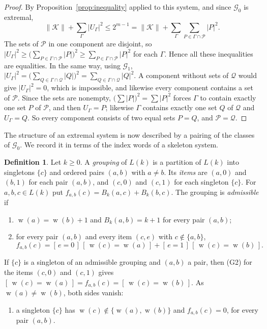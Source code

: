 \documentclass[11pt]{amsart}
\theoremstyle{definition}
\newtheorem{definition}[theorem]{Definition}
\theoremstyle{remark}
\numberwithin{equation}{section}
\newcommand{\cG}{\mathcal{G}}
\newcommand{\cK}{\mathcal{K}}
\newcommand{\cP}{\mathcal{P}}
\newcommand{\cQ}{\mathcal{Q}}
\newcommand{\Iv}[1]{[\,#1\,]}
\DeclareMathOperator{\wt}{w}
\begin{document}
\begin{proof}
By Proposition~\ref{prop:inequality} applied to this system, and since $\cG_0$ is extremal,
\[
\|\cK\|+\sum_\Gamma|U_\Gamma|^2\le 2^{m-1}=\|\cK\|+\sum_\Gamma\sum_{P\in\Gamma\cap\cP}|P|^2 .
\]
The sets of $\cP$ in one component are disjoint, so $|U_\Gamma|^2\ge\bigl(\sum_{P\in\Gamma\cap\cP}|P|\bigr)^2\ge\sum_{P\in\Gamma\cap\cP}|P|^2$ for each $\Gamma$. Hence all these inequalities are equalities. In the same way, using $\cG_1$, $|U_\Gamma|^2=\bigl(\sum_{Q\in\Gamma\cap\cQ}|Q|\bigr)^2=\sum_{Q\in\Gamma\cap\cQ}|Q|^2$. A component without sets of $\cQ$ would give $|U_\Gamma|^2=0$, which is impossible, and likewise every component contains a set of $\cP$. Since the sets are nonempty, $\bigl(\sum|P|\bigr)^2=\sum|P|^2$ forces $\Gamma$ to contain exactly one set $P$ of $\cP$, and then $U_\Gamma=P$; likewise $\Gamma$ contains exactly one set $Q$ of $\cQ$ and $U_\Gamma=Q$. So every component consists of two equal sets $P=Q$, and $\cP=\cQ$.
\end{proof}

The structure of an extremal system is now described by a pairing of the classes of $\cG_0$. We record it in terms of the index words of a skeleton system.

\begin{definition}\label{def:grouping}
Let $k\ge0$. A \emph{grouping} of $L(k)$ is a partition of $L(k)$ into singletons $\{c\}$ and ordered pairs $(a,b)$ with $a\ne b$. Its \emph{items} are $(a,0)$ and $(b,1)$ for each pair $(a,b)$, and $(c,0)$ and $(c,1)$ for each singleton $\{c\}$. For $a,b,c\in L(k)$ put $f_{a,b}(c)=B_k(a,c)+B_k(b,c)$. The grouping is \emph{admissible} if
\begin{enumerate}[label=\textup{(G\arabic*)}]
\item $\wt(a)=\wt(b)+1$ and $B_k(a,b)=k+1$ for every pair $(a,b)$;
\item for every pair $(a,b)$ and every item $(c,e)$ with $c\notin\{a,b\}$,
\[
f_{a,b}(c)=\Iv{e=0}\,\Iv{\wt(c)=\wt(a)}+\Iv{e=1}\,\Iv{\wt(c)=\wt(b)} .
\]
\end{enumerate}
\end{definition}

If $\{c\}$ is a singleton of an admissible grouping and $(a,b)$ a pair, then (G2) for the items $(c,0)$ and $(c,1)$ gives $\Iv{\wt(c)=\wt(a)}=f_{a,b}(c)=\Iv{\wt(c)=\wt(b)}$. As $\wt(a)\ne\wt(b)$, both sides vanish:
\begin{enumerate}[label=\textup{(G3)}]
\item a singleton $\{c\}$ has $\wt(c)\notin\{\wt(a),\wt(b)\}$ and $f_{a,b}(c)=0$, for every pair $(a,b)$.
\end{enumerate}
\end{document}
